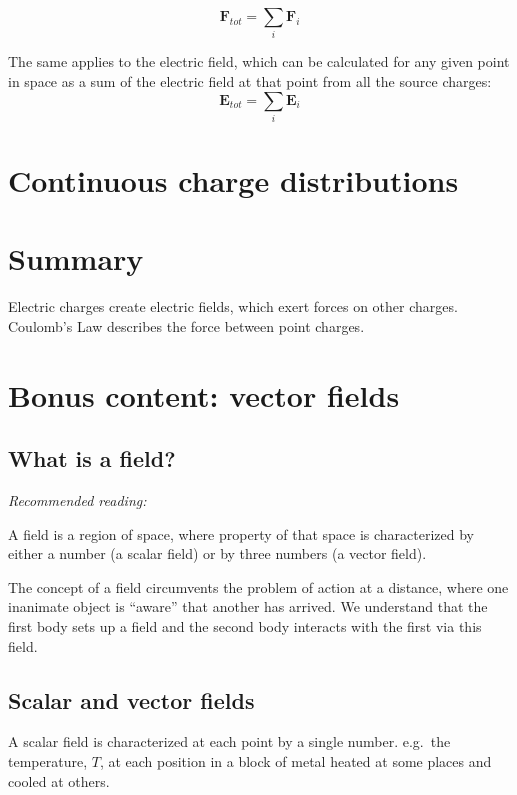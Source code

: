\documentclass[
  letterpaper,
  DIV=11,
  numbers=noendperiod]{scrreprt}
\begin{document}
\[ \mathrm{\mathbf{F}}_{tot} = \sum_i \mathrm{\mathbf{F}}_i \]

The same applies to the electric field, which can be calculated for any
given point in space as a sum of the electric field at that point from
all the source charges:
\[ \mathrm{\mathbf{E}}_{tot} = \sum_i \mathrm{\mathbf{E}}_i \]

\section{Continuous charge
distributions}\label{continuous-charge-distributions}

\section{Summary}\label{summary}

Electric charges create electric fields, which exert forces on other
charges. Coulomb's Law describes the force between point charges.

\section{Bonus content: vector
fields}\label{bonus-content-vector-fields}

\subsection{What is a field?}\label{what-is-a-field}

\emph{Recommended reading:}

A field is a region of space, where property of that space is
characterized by either a number (a scalar field) or by three numbers (a
vector field).

The concept of a field circumvents the problem of action at a distance,
where one inanimate object is ``aware'' that another has arrived. We
understand that the first body sets up a field and the second body
interacts with the first via this field.

\subsection{Scalar and vector fields}\label{scalar-and-vector-fields}

A scalar field is characterized at each point by a single number.
e.g.~the temperature, \(T\), at each position in a block of metal heated
at some places and cooled at others.
\end{document}
